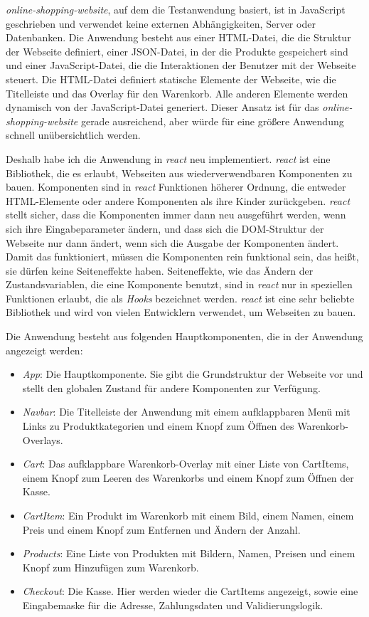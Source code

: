 \textit{online-shopping-website}, auf dem die Testanwendung basiert, ist in JavaScript geschrieben und verwendet keine externen Abhängigkeiten, Server oder Datenbanken.
Die Anwendung besteht aus einer HTML-Datei, die die Struktur der Webseite definiert, einer JSON-Datei, in der die Produkte gespeichert sind und einer JavaScript-Datei, die die Interaktionen der Benutzer mit der Webseite steuert.
Die HTML-Datei definiert statische Elemente der Webseite, wie die Titelleiste und das Overlay für den Warenkorb.
Alle anderen Elemente werden dynamisch von der JavaScript-Datei generiert.
Dieser Ansatz ist für das \textit{online-shopping-website} gerade ausreichend, aber würde für eine größere Anwendung schnell unübersichtlich werden.

Deshalb habe ich die Anwendung in \textit{react} neu implementiert.
\textit{react} ist eine Bibliothek, die es erlaubt, Webseiten aus wiederverwendbaren Komponenten zu bauen.
Komponenten sind in \textit{react} Funktionen höherer Ordnung, die entweder HTML-Elemente oder andere Komponenten als ihre Kinder zurückgeben.
\textit{react} stellt sicher, dass die Komponenten immer dann neu ausgeführt werden, wenn sich ihre Eingabeparameter ändern, und dass sich die DOM-Struktur der Webseite nur dann ändert, wenn sich die Ausgabe der Komponenten ändert.
Damit das funktioniert, müssen die Komponenten rein funktional sein, das heißt, sie dürfen keine Seiteneffekte haben.
Seiteneffekte, wie das Ändern der Zustandsvariablen, die eine Komponente benutzt, sind in \textit{react} nur in speziellen Funktionen erlaubt, die als \textit{Hooks} bezeichnet werden.
\textit{react} ist eine sehr beliebte Bibliothek und wird von vielen Entwicklern verwendet, um Webseiten zu bauen.

Die Anwendung besteht aus folgenden Hauptkomponenten, die in der Anwendung angezeigt werden:
\begin{itemize}
    \item \textit{App}: Die Hauptkomponente. Sie gibt die Grundstruktur der Webseite vor und stellt den globalen Zustand für andere Komponenten zur Verfügung.
    \item \textit{Navbar}: Die Titelleiste der Anwendung mit einem aufklappbaren Menü mit Links zu Produktkategorien und einem Knopf zum Öffnen des Warenkorb-Overlays.
    \item \textit{Cart}: Das aufklappbare Warenkorb-Overlay mit einer Liste von CartItems, einem Knopf zum Leeren des Warenkorbs und einem Knopf zum Öffnen der Kasse.
    \item \textit{CartItem}: Ein Produkt im Warenkorb mit einem Bild, einem Namen, einem Preis und einem Knopf zum Entfernen und Ändern der Anzahl.
    \item \textit{Products}: Eine Liste von Produkten mit Bildern, Namen, Preisen und einem Knopf zum Hinzufügen zum Warenkorb.
    \item \textit{Checkout}: Die Kasse. Hier werden wieder die CartItems angezeigt, sowie eine Eingabemaske für die Adresse, Zahlungsdaten und Validierungslogik.
\end{itemize}

